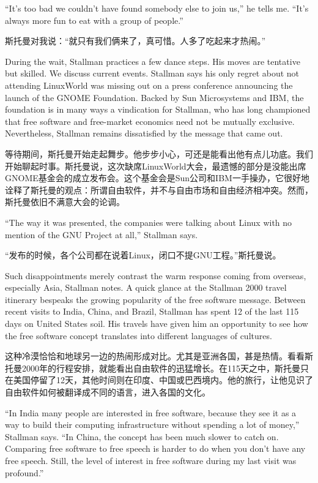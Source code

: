 \ifdefined\eng
``It's too bad we couldn't have found somebody else to join us,'' he tells me. ``It's always more fun to eat with a group of people.''
\fi

\ifdefined\chs
斯托曼对我说：``就只有我们俩来了，真可惜。人多了吃起来才热闹。''
\fi

\ifdefined\eng
During the wait, Stallman practices a few dance steps. His moves are tentative but skilled. We discuss current events. Stallman says his only regret about not attending LinuxWorld was missing out on a press conference announcing the launch of the GNOME Foundation. Backed by Sun Microsystems and IBM, the foundation is in many ways a vindication for Stallman, who has long championed that free software and free-market economics need not be mutually exclusive. Nevertheless, Stallman remains dissatisfied by the message that came out.
\fi

\ifdefined\chs
等待期间，斯托曼开始走起舞步。他步步小心，可还是能看出他有点儿功底。我们开始聊起时事。斯托曼说，这次缺席LinuxWorld大会，最遗憾的部分是没能出席GNOME基金会的成立发布会。这个基金会是Sun公司和IBM一手操办，它很好地诠释了斯托曼的观点：所谓自由软件，并不与自由市场和自由经济相冲突。然而，斯托曼依旧不满意大会的论调。
\fi

\ifdefined\eng
``The way it was presented, the companies were talking about Linux with no mention of the GNU Project at all,'' Stallman says.
\fi

\ifdefined\chs
``发布的时候，各个公司都在说着Linux，闭口不提GNU工程。''斯托曼说。
\fi

\ifdefined\eng
Such disappointments merely contrast the warm response coming from overseas, especially Asia, Stallman notes. A quick glance at the Stallman 2000 travel itinerary bespeaks the growing popularity of the free software message. Between recent visits to India, China, and Brazil, Stallman has spent 12 of the last 115 days on United States soil. His travels have given him an opportunity to see how the free software concept translates into different languages of cultures.
\fi

\ifdefined\chs
这种冷漠恰恰和地球另一边的热闹形成对比。尤其是亚洲各国，甚是热情。看看斯托曼2000年的行程安排，就能看出自由软件的迅猛增长。在115天之中，斯托曼只在美国停留了12天，其他时间则在印度、中国或巴西境内。他的旅行，让他见识了自由软件如何被翻译成不同的语言，进入各国的文化。
\fi

\ifdefined\eng
``In India many people are interested in free software, because they see it as a way to build their computing infrastructure without spending a lot of money,'' Stallman says. ``In China, the concept has been much slower to catch on. Comparing free software to free speech is harder to do when you don't have any free speech. Still, the level of interest in free software during my last visit was profound.''
\fi

